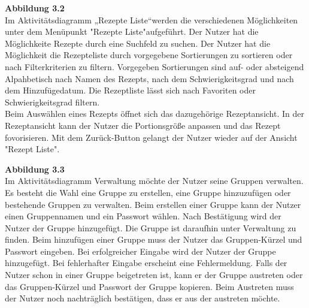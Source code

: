 \documentclass[parskip=full]{scrartcl}
\begin{document}
\textbf{Abbildung 3.2}\\
Im Aktivitätsdiagramm „Rezepte Liste“\space werden die verschiedenen Möglichkeiten unter dem Menüpunkt "Rezepte Liste"\space aufgeführt.
Der Nutzer hat die Möglichkeite Rezepte durch eine Suchfeld zu suchen.
Der Nutzer hat die Möglichkeit die Rezepteliste durch vorgegebene Sortierungen zu sortieren oder nach Filterkriterien zu filtern.
Vorgegeben Sortierungen sind auf- oder absteigend Alpahbetisch nach Namen des Rezepts, nach dem Schwierigkeitsgrad und nach dem Hinzufügedatum.
Die Rezeptliste lässt sich nach Favoriten oder Schwierigkeitsgrad filtern.\\
Beim Auswählen eines Rezepts öffnet sich das dazugehörige Rezeptansicht.
In der Rezeptansicht kann der Nutzer die Portionsgröße anpassen und das Rezept fovorisieren.
Mit dem Zurück-Button gelangt der Nutzer wieder auf der Ansicht "Rezept Liste".

\textbf{Abbildung 3.3}\\
Im Aktivitätsdiagramm Verwaltung möchte der Nutzer seine Gruppen verwalten.
Es besteht die Wahl eine Gruppe zu erstellen, eine Gruppe hinzuzufügen oder bestehende Gruppen zu verwalten.
Beim erstellen einer Gruppe kann der Nutzer einen Gruppennamen und ein Passwort wählen.
Nach Bestätigung wird der Nutzer der Gruppe hinzugefügt.
Die Gruppe ist daraufhin unter Verwaltung zu finden.
Beim hinzufügen einer Gruppe muss der Nutzer das Gruppen-Kürzel und Passwort eingeben.
Bei erfolgreicher Eingabe wird der Nutzer der Gruppe hinzugefügt.
Bei fehlerhafter Eingabe erscheint eine Fehlermeldung.
Falls der Nutzer schon in einer Gruppe beigetreten ist, kann er der Gruppe austreten oder das Gruppen-Kürzel und Passwort der Gruppe kopieren.
Beim Austreten muss der Nutzer noch nachträglich bestätigen, dass er aus der austreten möchte.
\newpage
\end{document}
